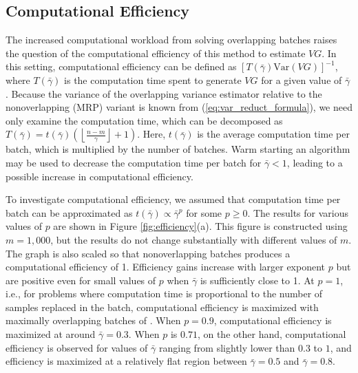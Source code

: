 \documentclass[12pt]{article}
\newcommand{\var}[1]{\mathrm{Var} \left( #1 \right)}
\newcommand{\nb}{\left\lfloor\tfrac{n-m}{\gamma}\right\rfloor+1}
\newcommand{\gammab}{\bar{\gamma}}
\begin{document}
\subsection{Computational Efficiency}
\label{ssec:compeff}


The increased computational workload from solving overlapping batches raises the question of the computational efficiency of this method to estimate $VG$.
In this setting, computational efficiency can be defined as $[T(\gammab)\var{VG}]^{-1}$, where $T(\gammab)$ is the computation time spent to generate $VG$ for a given value of $\gammab$.
Because the variance of the overlapping variance estimator relative to the nonoverlapping (MRP) variant is known from (\ref{eq:var_reduct_formula}), we need only examine the computation time, which can be decomposed as $T(\gammab) = t(\gammab)\left(\nb\right)$. 
Here, $t(\gammab)$ is the average computation time per batch, which is multiplied by the number of batches.
Warm starting an algorithm may be used to decrease the computation time per batch for $\gammab < 1$, leading to a possible increase in computational efficiency. 

To investigate computational efficiency, we assumed that computation time per batch can be approximated as $t(\gammab) \propto \gammab^p$ for some $p \geq 0$.
The results for various values of $p$ are shown in Figure \ref{fig:efficiency}(a). 
This figure is constructed using $m = 1,000$, but the results do not change substantially with different values of $m$.
The graph is also scaled so that nonoverlapping batches produces a computational efficiency of 1. 
Efficiency gains increase with larger exponent $p$ but are positive even for small values of $p$ when $\gammab$ is sufficiently close to 1.
At $p=1$, i.e., for problems where computation time is proportional to the number of samples replaced in the batch, computational efficiency is maximized with maximally overlapping batches of \cite{Meketon1984}.
When $p=0.9$, computational efficiency is maximized at around $\gammab=0.3$.
When $p$ is $0.71$, on the other hand, computational efficiency is observed for values of $\gammab$ ranging from slightly lower than $0.3$ to $1$, and efficiency is maximized at a relatively flat region between $\gammab=0.5$ and $\gammab=0.8$.
\end{document}
